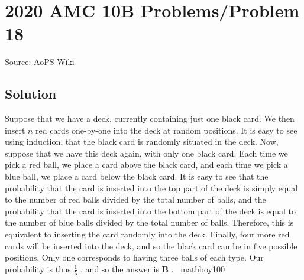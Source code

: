\documentclass[12pt]{article}
\begin{document}
\section*{{2020 AMC 10B Problems/Problem 18}}
Source: AoPS Wiki

\subsection*{Solution}
Suppose that we have a deck, currently containing just one black card. We then insert $n$ red cards one-by-one into the deck at random positions. It is easy to see using induction, that the black card is randomly situated in the deck. Now, suppose that we have this deck again, with only one black card. Each time we pick a red ball, we place a card above the black card, and each time we pick a blue ball, we place a card below the black card. It is easy to see that the probability that the card is inserted into the top part of the deck is simply equal to the number of red balls divided by the total number of balls, and the probability that the card is inserted into the bottom part of the deck is equal to the number of blue balls divided by the total number of balls. Therefore, this is equivalent to inserting the card randomly into the deck. Finally, four more red cards will be inserted into the deck, and so the black card can be in five possible positions. Only one corresponds to having three balls of each type. Our probability is thus $\frac{1}{5}$ , and so the answer is $\boxed{\textbf{B}}$ . ~mathboy100
\end{document}
